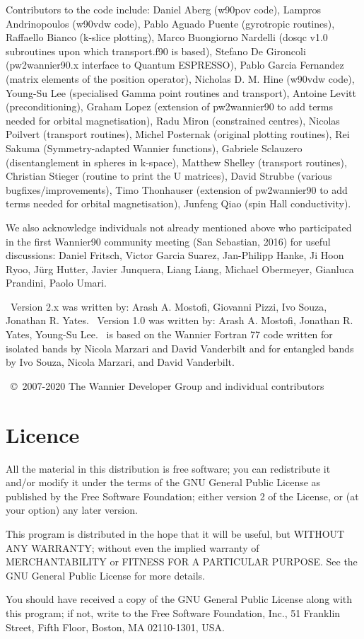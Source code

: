 Contributors to the code include:
Daniel Aberg (w90pov code),
Lampros Andrinopoulos (w90vdw code),
Pablo Aguado Puente (gyrotropic routines),
Raffaello Bianco (k-slice plotting),
Marco Buongiorno Nardelli (dosqc v1.0 subroutines upon which transport.f90 is based),
Stefano De Gironcoli (pw2wannier90.x interface to Quantum ESPRESSO),
Pablo Garcia Fernandez (matrix elements of the position operator),
Nicholas D. M. Hine (w90vdw code),
Young-Su Lee (specialised Gamma point routines and transport),
Antoine Levitt (preconditioning),
Graham Lopez (extension of pw2wannier90 to add terms needed for orbital magnetisation),
Radu Miron (constrained centres),
Nicolas Poilvert (transport routines),
Michel Posternak (original plotting routines),
Rei Sakuma (Symmetry-adapted Wannier functions),
Gabriele Sclauzero (disentanglement in spheres in k-space),
Matthew Shelley (transport routines),
Christian Stieger (routine to print the U matrices),
David Strubbe (various bugfixes/improvements),
Timo Thonhauser (extension of pw2wannier90 to add terms needed for orbital magnetisation), Junfeng Qiao (spin Hall conductivity).

We also acknowledge individuals not already mentioned above who participated in the first Wannier90 community meeting (San Sebastian, 2016) for useful discussions:
Daniel Fritsch,
Victor Garcia Suarez,
Jan-Philipp Hanke,
Ji Hoon Ryoo,
J\"urg Hutter,
Javier Junquera,
Liang Liang,
Michael Obermeyer,
Gianluca Prandini,
Paolo Umari.

\wannier\ Version 2.x was written by:
Arash A. Mostofi, Giovanni Pizzi, Ivo Souza, Jonathan R. Yates.
\wannier\ Version 1.0 was written by:
Arash A. Mostofi, Jonathan R. Yates, Young-Su Lee.
\wannier\ is based on the Wannier Fortran 77 code written for isolated bands by Nicola Marzari
and David Vanderbilt and for entangled bands by Ivo Souza, Nicola Marzari,
and David Vanderbilt.

\wannier\ \copyright\ 2007-2020 The Wannier Developer Group and individual contributors

\section*{Licence}
All the material in this distribution is free software; you can
redistribute it and/or
modify it under the terms of the GNU General Public License
as published by the Free Software Foundation; either version 2
of the License, or (at your option) any later version.

This program is distributed in the hope that it will be useful,
but WITHOUT ANY WARRANTY; without even the implied warranty of
MERCHANTABILITY or FITNESS FOR A PARTICULAR PURPOSE.  See the
GNU General Public License for more details.

You should have received a copy of the GNU General Public License
along with this program; if not, write to the Free Software
Foundation, Inc., 51 Franklin Street, Fifth Floor, Boston, MA  02110-1301, USA.
